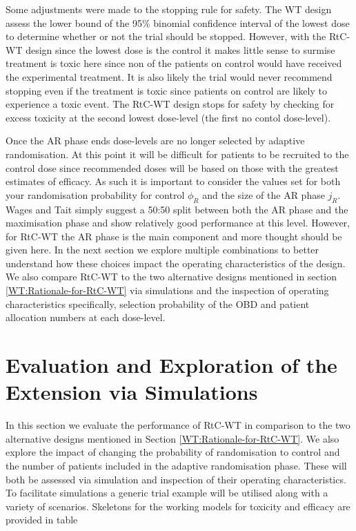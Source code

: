Some adjustments were made to the stopping rule for safety. The WT design assess the lower bound of the 95\% binomial confidence interval of the lowest dose to determine whether or not the trial should be stopped. However, with the RtC-WT design since the lowest dose is the control it makes little sense to surmise treatment is toxic here since non of the patients on control would have received the experimental treatment. It is also likely the trial would never recommend stopping even if the treatment is toxic since patients on control are likely to experience a toxic event. The RtC-WT design stops for safety by checking for excess toxicity at the second lowest dose-level (the first no contol dose-level). 

Once the AR phase ends dose-levels are no longer selected by adaptive randomisation. At this point it will be difficult for patients to be recruited to the control dose since recommended doses will be based on those with the greatest estimates of efficacy. As such it is important to consider the values set for both your randomisation probability for control $\phi_R$ and the size of the AR phase $j_R$. Wages and Tait simply suggest a 50:50 split between both the AR phase and the maximisation phase and show relatively good performance at this level. However, for RtC-WT the AR phase is the main component and more thought should be given here. In the next section we explore multiple combinations to better understand how these choices impact the operating characteristics of the design. We also compare RtC-WT to the two alternative designs mentioned in section  \ref{WT:Rationale-for-RtC-WT} via simulations and the inspection of operating characteristics specifically, selection probability of the OBD and patient allocation numbers at each dose-level. 
 
 
 \section{Evaluation and Exploration of the Extension via Simulations}
 \label{WT:Evaluation-of-the-Extension}
 
 In this section we evaluate the performance of RtC-WT in comparison to the two alternative designs mentioned in Section \ref{WT:Rationale-for-RtC-WT}. We also explore the impact of changing the probability of randomisation to control and the number of patients included in the adaptive randomisation phase. These will both be assessed via simulation and inspection of their operating characteristics. To facilitate simulations a generic trial example will be utilised along with a variety of scenarios. Skeletons for the working models for toxicity and efficacy are provided in table \
 
